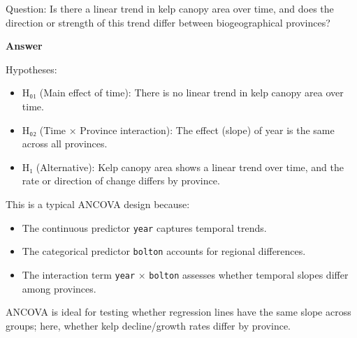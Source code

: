 \documentclass[
  british,
  10pt,
]{article}
\providecommand{\tightlist}{%
  \setlength{\itemsep}{0pt}\setlength{\parskip}{0pt}}
\let\oldtexttt\texttt
\renewcommand{\texttt}[1]{\oldtexttt{\small #1}}
\begin{document}
Question: Is there a linear trend in kelp canopy area over time, and
does the direction or strength of this trend differ between
biogeographical provinces?

\textbf{Answer}

Hypotheses:

\begin{itemize}
\tightlist
\item
  H₀₁ (Main effect of time): There is no linear trend in kelp canopy
  area over time.
\item
  H₀₂ (Time × Province interaction): The effect (slope) of year is the
  same across all provinces.
\item
  H₁ (Alternative): Kelp canopy area shows a linear trend over time, and
  the rate or direction of change differs by province.
\end{itemize}

This is a typical ANCOVA design because:

\begin{itemize}
\tightlist
\item
  The continuous predictor \texttt{year} captures temporal trends.
\item
  The categorical predictor \texttt{bolton} accounts for regional
  differences.
\item
  The interaction term \texttt{year} × \texttt{bolton} assesses whether
  temporal slopes differ among provinces.
\end{itemize}

ANCOVA is ideal for testing whether regression lines have the same slope
across groups; here, whether kelp decline/growth rates differ by
province.
\end{document}

